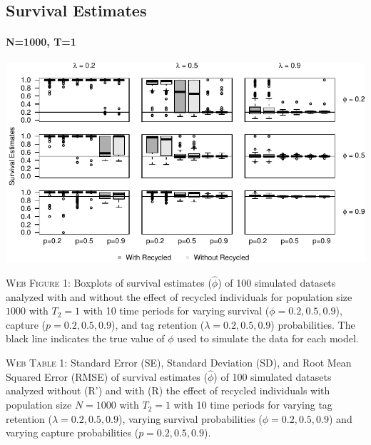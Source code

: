 \documentclass[]{article}
\let\oldparagraph\paragraph
\renewcommand{\paragraph}[1]{\oldparagraph{#1}\mbox{}}
\begin{document}
\newpage 

\subsection{Survival Estimates}\label{survival-estimates}

\paragraph{N=1000, T=1}\label{n1000-t1}

\includegraphics{Appendix_BW_files/figure-latex/figure1_survival_GJSTL1-1.pdf}

\textsc{Web Figure 1:} Boxplots of survival estimates (\(\hat{\phi}\))
of 100 simulated datasets analyzed with and without the effect of
recycled individuals for population size \(1000\) with \(T_2=1\) with 10
time periods for varying survival (\(\phi=0.2,0.5,0.9\)), capture
(\(p=0.2,0.5,0.9\)), and tag retention (\(\lambda=0.2,0.5,0.9\))
probabilities. The black line indicates the true value of \(\phi\) used
to simulate the data for each model.

\textsc{Web Table 1:} Standard Error (SE), Standard Deviation (SD), and
Root Mean Squared Error (RMSE) of survival estimates (\(\hat{\phi}\)) of
100 simulated datasets analyzed without (R') and with (R) the effect of
recycled individuals with population size \(N=1000\) with \(T_2=1\) with
10 time periods for varying tag retention (\(\lambda=0.2,0.5,0.9\)),
varying survival probabilities (\(\phi=0.2,0.5,0.9\)) and varying
capture probabilities (\(p=0.2,0.5,0.9\)).
\end{document}
